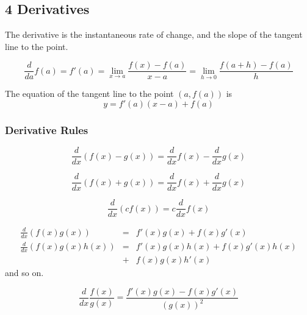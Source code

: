 \pagebreak

\subsection*{4 Derivatives}

The derivative is the instantaneous rate of change, and the slope of the tangent line to the point.

\begin{definition}[Derivative ($f'(a)$)]
  \[
    \frac{d}{da} f(a) = f'(a) = \lim_{x \to a} \frac{f(x)-f(a)}{x - a} = \lim_{h \to 0} \frac{f(a+h)-f(a)}{h}
  \]
\end{definition}

\begin{theorem}
  The equation of the tangent line to the point $(a, f(a))$ is
  \[
    y = f'(a)(x-a) + f(a)
  \]
\end{theorem}

\subsubsection*{Derivative Rules}

\begin{theorem}
  \[
    \frac{d}{dx}(f(x) - g(x)) = \frac{d}{dx}f(x) - \frac{d}{dx}g(x)
  \]
\end{theorem}

\begin{theorem}
  \[
    \frac{d}{dx}(f(x) + g(x)) = \frac{d}{dx}f(x) + \frac{d}{dx}g(x)
  \]
\end{theorem}

\begin{theorem}
  \[
    \frac{d}{dx}(cf(x)) = c\frac{d}{dx}f(x)
  \]
\end{theorem}

\begin{theorem}
  \[\begin{aligned}
    \frac{d}{dx}(f(x)g(x)) &= &f'(x)g(x) + f(x)g'(x) \\
    \frac{d}{dx}(f(x)g(x)h(x)) &= &f'(x)g(x)h(x) + f(x)g'(x)h(x) \\
                               &+ &f(x)g(x)h'(x)
  \end{aligned}\]
  and so on.
\end{theorem}

\begin{theorem}
  \[
    \frac{d}{dx}\frac{f(x)}{g(x)} = \frac{f'(x)g(x) - f(x)g'(x)}{(g(x))^2}
  \]
\end{theorem}

